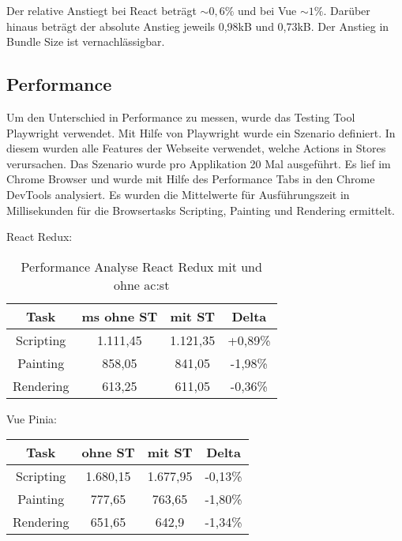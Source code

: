Der relative Anstiegt bei React beträgt $\sim0,6\%$ und bei Vue $\sim1\%$. Darüber hinaus beträgt der absolute Anstieg jeweils 0,98kB und 0,73kB. Der Anstieg in Bundle Size ist vernachlässigbar.

\subsection{Performance}

Um den Unterschied in Performance zu messen, wurde das Testing Tool Playwright verwendet. Mit Hilfe von Playwright wurde ein Szenario definiert. In diesem wurden alle Features der Webseite verwendet, welche Actions in Stores verursachen. Das Szenario wurde pro Applikation 20 Mal ausgeführt. Es lief im Chrome Browser und wurde mit Hilfe des Performance Tabs in den Chrome DevTools analysiert. Es wurden die Mittelwerte für Ausführungszeit in Millisekunden für die Browsertasks Scripting, Painting und Rendering ermittelt.

React Redux:

\begin{table}[h!]
  \caption{Performance Analyse React Redux mit und ohne \acrshort{ac:st}}
  \label{tab:performanceAnalysisReactSTvsNoST}

  \begin{center}
    \begin{tabular}{|c|c|c|c|} 
    \hline
    Task & ms ohne ST & mit ST & Delta \\ [0.5ex]
    \hline\hline
    Scripting & 1.111,45 & 1.121,35 & +0,89\% \\
    \hline
    Painting & 858,05 & 841,05 & -1,98\% \\
    \hline
    Rendering & 613,25 & 611,05 & -0,36\% \\
    \hline
    \end{tabular}
  \end{center}
\end{table}

Vue Pinia:

\begin{center}
  \begin{tabular}{|c|c|c|c|} 
   \hline
   Task & ohne ST & mit ST & Delta \\ [0.5ex]
   \hline\hline
   Scripting & 1.680,15 & 1.677,95 & -0,13\% \\
   \hline
   Painting & 777,65 & 763,65 & -1,80\% \\
   \hline
   Rendering & 651,65 & 642,9 & -1,34\% \\
   \hline
  \end{tabular}
\end{center}

